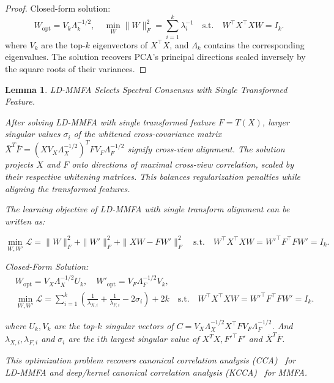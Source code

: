 \documentclass{article}
\newtheorem{lemma}{Lemma} %
\begin{document}
\begin{proof}
Closed-form solution:  
\begin{equation}
    W_{\text{opt}} = V_k \Lambda_k^{-1/2}, \quad \min_{W} \|W\|_F^2 = \sum_{i = 1}^k \lambda_{i}^{-1} \quad \text{s.t.} \quad W^\top X^\top X W = I_k.
\end{equation}  
where \( V_k \) are the top-\(k \) eigenvectors of \( X^\top X \), and \( \Lambda_k \) contains the corresponding eigenvalues. The solution recovers PCA’s principal directions scaled inversely by the square roots of their variances.  
    
\end{proof}
 

\begin{lemma}\label{lem:CCA}LD-MMFA Selects Spectral Consensus with Single Transformed Feature.


After solving LD-MMFA with single transformed feature $F = T(X)$, larger singular values \( \sigma_i \) of the whitened cross-covariance matrix $\bar{X}^T \bar{F} = (X V_X\Lambda_X^{-1/2})^TFV_F\Lambda_F^{-1/2}$ signify cross-view alignment. The solution projects \( X \) and \( F \) onto directions of maximal cross-view correlation, scaled by their respective whitening matrices. This balances regularization penalties while aligning the transformed features.  


The learning objective of LD-MMFA with single transform alignment can be written as:

\begin{equation}
    \min_{W, W'} \mathcal{L} = \|W\|_F^2 + \|W'\|_F^2 + \|XW - FW'\|_F^2 \quad \text{s.t.} \quad W^\top X^\top X W = W'^\top F^\top F W' = I_k.
\end{equation}  

Closed-Form Solution:  
\begin{equation}
\begin{aligned}
    & W_{\text{opt}} = V_X\Lambda_X^{-1/2} U_k, \quad W'_{\text{opt}} = V_F\Lambda_F^{-1/2} V_k, \\
    & \min_{W, W'} \mathcal{L} = \sum_{i=1}^{k} ( \frac{1}{\lambda_{X,i}} + \frac{1}{\lambda_{F,i}} - 2 \sigma_i ) + 2k \quad \text{s.t.} \quad W^\top X^\top X W = W'^\top F^\top F W' = I_k.
\end{aligned}
\end{equation}  


where \( U_k, V_k \) are the top-\(k \) singular vectors of \( C = V_X\Lambda_X^{-1/2} X^\top F V_F\Lambda_F^{-1/2} \). And $\lambda_{X,i}, \lambda_{F,i}$ and $\sigma_i$ are the $i$th largest singular value of $X^TX, F'^\top F'$ and $\bar{X}^T \bar{F}$.

This optimization problem recovers canonical correlation analysis (CCA)~\cite{thompson2000canonical} for LD-MMFA and deep/kernel canonical correlation analysis (KCCA)~\cite{fukumizu2007statistical} for MMFA.

\end{lemma}
\end{document}
